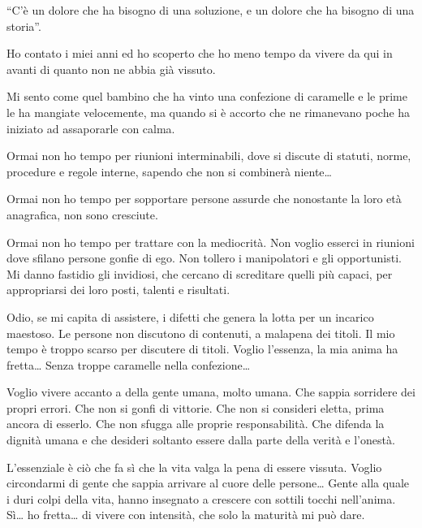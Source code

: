 \documentclass[12pt]{book} %
\begin{document}
\bigskip

“C'è un dolore che ha bisogno di una soluzione, e un dolore che ha bisogno di una
storia”.


\bigskip
\begin{mdframed}[linewidth=1pt]
Ho contato i miei anni ed ho scoperto che ho meno tempo da vivere da qui in avanti di quanto non ne abbia già vissuto.


\bigskip

Mi sento come quel bambino che ha vinto una confezione di caramelle e le prime le ha mangiate velocemente, ma quando si
è accorto che ne rimanevano poche ha iniziato ad assaporarle con calma.


\bigskip

Ormai non ho tempo per riunioni interminabili, dove si discute di statuti, norme, procedure e regole interne, sapendo
che non si combinerà niente…


\bigskip

Ormai non ho tempo per sopportare persone assurde che nonostante la loro età anagrafica, non sono cresciute.


\bigskip

Ormai non ho tempo per trattare con la mediocrità. Non voglio esserci in riunioni dove sfilano persone gonfie di ego.
Non tollero i manipolatori e gli opportunisti. Mi danno fastidio gli invidiosi, che cercano di screditare quelli più
capaci, per appropriarsi dei loro posti, talenti e risultati.


\bigskip

Odio, se mi capita di assistere, i difetti che genera la lotta per un incarico maestoso. Le persone non discutono di
contenuti, a malapena dei titoli. Il mio tempo è troppo scarso per discutere di titoli. Voglio
l'essenza, la mia anima ha fretta… Senza troppe caramelle nella confezione…


\bigskip

Voglio vivere accanto a della gente umana, molto umana. Che sappia sorridere dei propri errori. Che non si gonfi di
vittorie. Che non si consideri eletta, prima ancora di esserlo. Che non sfugga alle proprie responsabilità. Che difenda
la dignità umana e che desideri soltanto essere dalla parte della verità e l'onestà.


\bigskip

L'essenziale è ciò che fa sì che la vita valga la pena di essere vissuta. Voglio circondarmi di
gente che sappia arrivare al cuore delle persone… Gente alla quale i duri colpi della vita, hanno insegnato a crescere
con sottili tocchi nell'anima. Sì… ho fretta… di vivere con intensità, che solo la maturità mi può
dare.



\end{mdframed}
\end{document}
